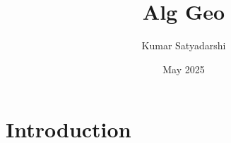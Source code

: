\documentclass{article}
\title{Alg Geo}
\author{Kumar Satyadarshi}
\date{May 2025}
\begin{document}
\maketitle

\section{Introduction}
\end{document}

